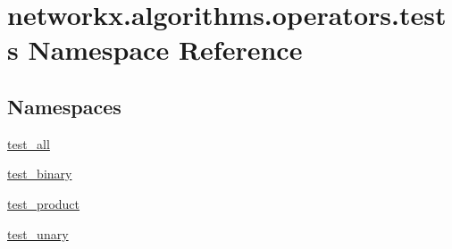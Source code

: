 \hypertarget{namespacenetworkx_1_1algorithms_1_1operators_1_1tests}{}\section{networkx.\+algorithms.\+operators.\+tests Namespace Reference}
\label{namespacenetworkx_1_1algorithms_1_1operators_1_1tests}
\subsection*{Namespaces}
\begin{DoxyCompactItemize}
\item 
 \hyperlink{namespacenetworkx_1_1algorithms_1_1operators_1_1tests_1_1test__all}{test\+\_\+all}
\item 
 \hyperlink{namespacenetworkx_1_1algorithms_1_1operators_1_1tests_1_1test__binary}{test\+\_\+binary}
\item 
 \hyperlink{namespacenetworkx_1_1algorithms_1_1operators_1_1tests_1_1test__product}{test\+\_\+product}
\item 
 \hyperlink{namespacenetworkx_1_1algorithms_1_1operators_1_1tests_1_1test__unary}{test\+\_\+unary}
\end{DoxyCompactItemize}
